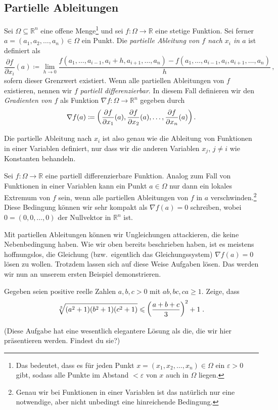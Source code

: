 \subsection*{Partielle Ableitungen}
\begin{definition}
	Sei $\Omega\subseteq \mathbb R^n$ eine offene Menge\footnote{Das bedeutet, dass es für jeden Punkt $x=(x_1,x_2,\dotsc,x_n)\in\Omega$ ein $\varepsilon >0$ gibt, sodass alle Punkte im Abstand $<\varepsilon$ von $x$ auch in $\Omega$ liegen.} und sei $f\colon \Omega\rightarrow \mathbb R$ eine stetige Funktion. Sei ferner $a=(a_1,a_2,\dotsc,a_n)\in\Omega$ ein Punkt. Die \emph{partielle Ableitung von $f$ nach $x_i$ in $a$} ist definiert als
	\begin{equation*}
		\frac{\partial f}{\partial x_i}(a)\coloneqq \lim_{h\rightarrow 0}\frac{f(a_1,\dotsc,a_{i-1},a_{i}+h,a_{i+1},\dotsc,a_n)-f(a_1,\dotsc,a_{i-1},a_{i},a_{i+1},\dotsc,a_n)}{h}\,,
	\end{equation*}
	sofern dieser Grenzwert existiert. Wenn alle partiellen Ableitungen von $f$ existieren, nennen wir $f$ \emph{partiell differenzierbar}. In diesem Fall definieren wir den \emph{Gradienten von $f$} als Funktion $\nabla f\colon \Omega\rightarrow \mathbb R^n$ gegeben durch
	\begin{equation*}
		\nabla f(a)\coloneqq \parens*{\frac{\partial f}{\partial x_1}(a),\frac{\partial f}{\partial x_2}(a),\dotsc,\frac{\partial f}{\partial x_n}(a)}\,.
	\end{equation*}
\end{definition}
Die partielle Ableitung nach $x_i$ ist also genau wie die Ableitung von Funktionen in einer Variablen definiert, nur dass wir die anderen Variablen $x_j$, $j\neq i$ wie Konstanten behandeln.

Sei $f\colon \Omega\rightarrow \mathbb R$ eine partiell differenzierbare Funktion. Analog zum Fall von Funktionen in einer Variablen kann ein Punkt $a\in \Omega$ nur dann ein lokales Extremum von $f$ sein, wenn alle partiellen Ableitungen von $f$ in $a$ verschwinden.\footnote{Genau wir bei Funktionen in einer Variablen ist das natürlich nur eine notwendige, aber nicht unbedingt eine hinreichende Bedingung.} Diese Bedingung können wir sehr kompakt als $\nabla f(a)=0$ schreiben, wobei $0=(0,0,\dotsc,0)$ der Nullvektor in $\mathbb R^n$ ist.

Mit partiellen Ableitungen können wir Ungleichungen attackieren, die keine Nebenbedingung haben. Wie wir oben bereits beschrieben haben, ist es meistens hoffnungslos, die Gleichung (bzw.\ eigentlich das Gleichungssystem) $\nabla f(a)=0$ lösen zu wollen. Trotzdem lassen sich auf diese Weise Aufgaben lösen. Das werden wir nun an unserem ersten Beispiel demonstrieren.
\begin{aufgabe*}
	Gegeben seien positive reelle Zahlen $a,b,c>0$ mit $ab,bc,ca\geqslant 1$. Zeige, dass
	\begin{equation*}
		\sqrt[3]{\parens*{a^2+1}\parens*{b^2+1}\parens*{c^2+1}}\leqslant\parens*{\frac{a+b+c}{3}}^2+1\;.
	\end{equation*}
\end{aufgabe*}
(Diese Aufgabe hat eine wesentlich elegantere Lösung als die, die wir hier präsentieren werden. Findest du sie?)

